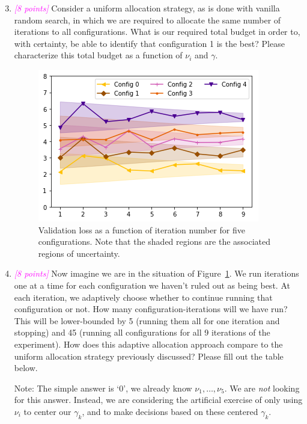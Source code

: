 \documentclass{exam}
\newcommand{\grade}[1]{\small\textcolor{magenta}{\emph{[#1 points]}} \normalsize}
\begin{document}
\begin{enumerate}[label=(\alph*)]
\setcounter{enumi}{2}
    \item \grade{8} Consider a uniform allocation strategy, as is done with vanilla random search, in which we are required to allocate the same number of iterations to all configurations.  What is our required total budget in order to, with certainty, be able to identify that configuration 1 is the best?  Please characterize this total budget as a function of $\nu_i$ and $\gamma$.
    
    \vspace{1in}

\clearpage

\begin{figure}[bh]
    \centering
    \includegraphics[width=.6\textwidth]{hw5/adaptive_example.png}
    \caption{Validation loss as a function of iteration number for five configurations.  Note that the shaded regions are the associated regions of uncertainty.}
    \label{fig:adaptive_example}
\end{figure}    
    
    \item \grade{8}  Now imagine we are in the situation of  Figure~\ref{fig:adaptive_example}. We run iterations one at a time for each configuration we haven't ruled out as being best. At each iteration, we adaptively choose whether to continue running that configuration or not. How many configuration-iterations will we have run? This will be lower-bounded by 5 (running them all for one iteration and stopping) and 45 (running all configurations for all 9 iterations of the experiment). How does this adaptive allocation approach compare to the uniform allocation strategy previously discussed?  Please fill out the table below.

    Note: The simple answer is `0', we already know $\nu_1,\dots,\nu_5$. We are \emph{not} looking for this answer. Instead, we are considering the artificial exercise of only using $\nu_i$ to center our $\gamma_k$, and to make decisions based on these centered $\gamma_k$. 
    

\end{enumerate}
\end{document}
